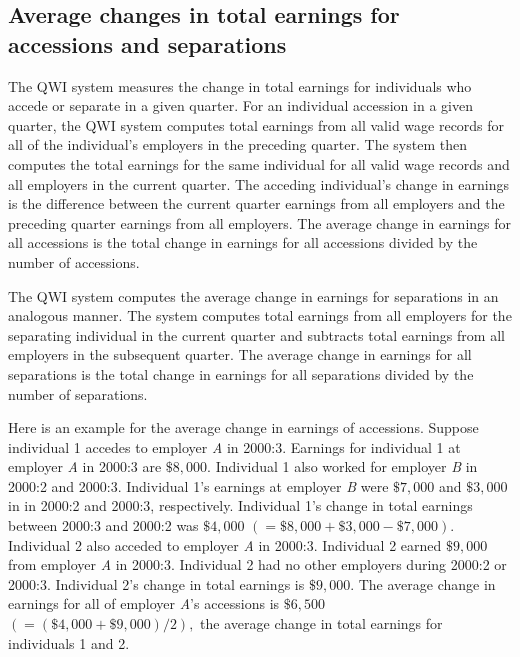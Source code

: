 \subsection{Average changes in total earnings for accessions and separations}

 

The QWI system measures the change in total earnings for individuals who
accede or separate in a given quarter. For an individual accession in a
given quarter, the QWI system computes total earnings from all valid wage
records for all of the individual's employers in the preceding quarter. The
system then computes the total earnings for the same individual for all
valid wage records and all employers in the current quarter. The acceding
individual's change in earnings is the difference between the current
quarter earnings from all employers and the preceding quarter earnings from
all employers. The average change in earnings for all accessions is the
total change in earnings for all accessions divided by the number of
accessions.

The QWI system computes the average change in earnings for separations in an
analogous manner. The system computes total earnings from all employers for
the separating individual in the current quarter and subtracts total
earnings from all employers in the subsequent quarter. The average change in
earnings for all separations is the total change in earnings for all
separations divided by the number of separations.

Here is an example for the average change in earnings of accessions. Suppose
individual 1 accedes to employer \textit{A} in 2000:3. Earnings for
individual 1 at employer \textit{A} in 2000:3 are $\$8,000$. Individual 1
also worked for employer \textit{B} in 2000:2 and 2000:3. Individual 1's
earnings at employer \textit{B} were $\$7,000$ and $\$3,000$ in in 2000:2
and 2000:3, respectively. Individual 1's change in total earnings between
2000:3 and 2000:2 was $\$4,000$ $\left( =\$8,000+\$3,000-\$7,000\right) .$
Individual 2 also acceded to employer \textit{A} in 2000:3. Individual 2
earned $\$9,000$ from employer \textit{A} in 2000:3. Individual 2 had no
other employers during 2000:2 or 2000:3. Individual 2's change in total
earnings is $\$9,000.$ The average change in earnings for all of employer 
\textit{A}'s accessions is $\$6,500$ $\left( =\left( \$4,000+\$9,000\right)
/2\right) ,$ the average change in total earnings for individuals 1 and 2.

